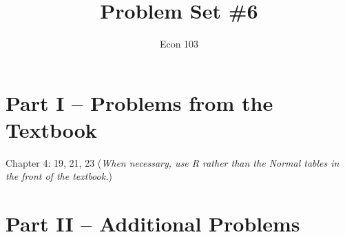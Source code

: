 \documentclass[addpoints,12pt]{exam}
\title{Problem Set \#6}
\author{Econ 103}
\date{}
\begin{document}
\maketitle


\section*{Part I -- Problems from the Textbook}
Chapter 4: 19, 21, 23
(\emph{When necessary, use R rather than the Normal tables in the front of the textbook.})



\section*{Part II -- Additional Problems}
\end{document}
